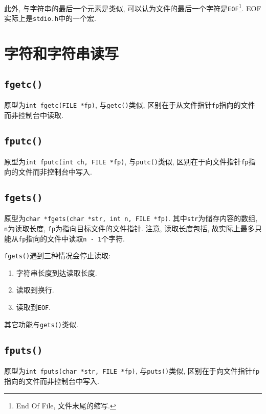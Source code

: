         此外, 与字符串的最后一个元素是\texttt{}类似, 可以认为文件的最后一个字符是\texttt{EOF}\footnote{End Of File, 文件末尾的缩写.}. EOF实际上是\texttt{stdio.h}中的一个宏.

    \section{字符和字符串读写}
        \subsection*{\texttt{fgetc()}}
            原型为\texttt{int fgetc(FILE *fp)}, 与\texttt{getc()}类似, 区别在于从文件指针\texttt{fp}指向的文件而非控制台中读取.

        \subsection*{\texttt{fputc()}}
            原型为\texttt{int fputc(int ch, FILE *fp)}, 与\texttt{putc()}类似, 区别在于向文件指针\texttt{fp}指向的文件而非控制台中写入.

        \subsection*{\texttt{fgets()}}
            原型为\texttt{char *fgets(char *str, int n, FILE *fp)}. 其中\texttt{str}为储存内容的数组, \texttt{n}为读取长度, \texttt{fp}为指向目标文件的文件指针. 注意, 读取长度包括\texttt{}, 故实际上最多只能从\texttt{fp}指向的文件中读取\texttt{n - 1}个字符.

            \texttt{fgets()}遇到三种情况会停止读取:
            \begin{enumerate}
                \item 字符串长度到达读取长度.
                \item 读取到换行.
                \item 读取到\texttt{EOF}.
            \end{enumerate}

            其它功能与\texttt{gets()}类似.
        
        \subsection*{\texttt{fputs()}}
            原型为\texttt{int fputs(char *str, FILE *fp)}, 与\texttt{puts()}类似, 区别在于向文件指针\texttt{fp}指向的文件而非控制台中写入.

